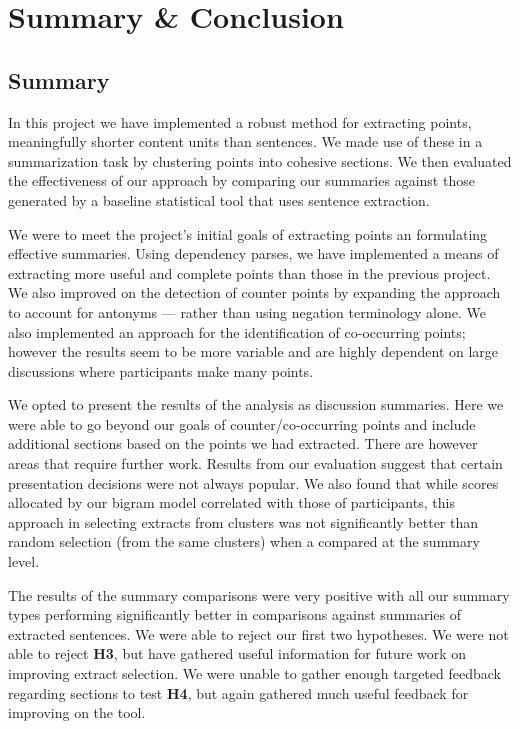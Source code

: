 \chapter{Summary \& Conclusion \label{chap:conclusion}}
  \section{Summary}
    In this project we have implemented a robust method for extracting points, meaningfully shorter content units than sentences. We made use of these in a summarization task by clustering points into cohesive sections. We then evaluated the effectiveness of our approach by comparing our summaries against those generated by a baseline statistical tool that uses sentence extraction.

    We were to meet the project's initial goals of extracting points an formulating effective summaries. Using dependency parses, we have implemented a means of extracting more useful and complete points than those in the previous project. We also improved on the detection of counter points by expanding the approach to account for antonyms --- rather than using negation terminology alone. We also implemented an approach for the identification of co-occurring points; however the results seem to be more variable and are highly dependent on large discussions where participants make many points.

    We opted to present the results of the analysis as discussion summaries. Here we were able to go beyond our goals of counter/co-occurring points and include additional sections based on the points we had extracted. There are however areas that require further work. Results from our evaluation suggest that certain presentation decisions were not always popular. We also found that while scores allocated by our bigram model correlated with those of participants, this approach in selecting extracts from clusters was not significantly better than random selection (from the same clusters) when a compared at the summary level.

    The results of the summary comparisons were very positive with all our summary types performing significantly better in comparisons against summaries of extracted sentences. We were able to reject our first two hypotheses. We were not able to reject \textbf{H3}, but have gathered useful information for future work on improving extract selection. We were unable to gather enough targeted feedback regarding sections to test \textbf{H4}, but again gathered much useful feedback for improving on the tool.

